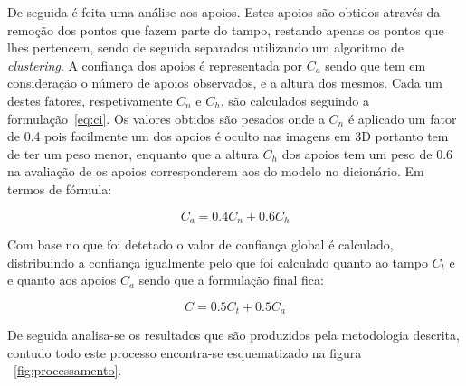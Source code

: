De seguida é feita uma análise aos apoios. Estes apoios são obtidos através da remoção dos pontos que fazem parte do tampo, restando apenas os pontos que lhes pertencem, sendo de seguida separados utilizando um algoritmo de \emph{clustering}. A confiança dos apoios é representada por \(C_a\) sendo que tem em consideração o número de apoios observados, e a altura dos mesmos. Cada um destes fatores, respetivamente \(C_n\) e \(C_h\), são calculados seguindo a formulação~\ref{eq:ci}. Os valores obtidos são pesados onde a \(C_n\) é aplicado um fator de 0.4 pois facilmente um dos apoios é oculto nas imagens em 3D portanto tem de ter um peso menor, enquanto que a altura \(C_h\) dos apoios tem um peso de 0.6 na avaliação de os apoios corresponderem aos do modelo no dicionário. Em termos de fórmula:

\begin{equation}\label{eq:ca}
C_a = 0.4C_n + 0.6C_h
\end{equation}

Com base no que foi detetado o valor de confiança global é calculado, distribuindo a confiança igualmente pelo que foi calculado quanto ao tampo \(C_t\) e e quanto aos apoios \(C_a\) sendo que a formulação final fica:

\begin{equation}\label{eq:cfinal}
C = 0.5C_t + 0.5C_a
\end{equation}

De seguida analisa-se os resultados que são produzidos pela metodologia descrita, contudo todo este processo encontra-se esquematizado na figura ~\ref{fig:processamento}.


